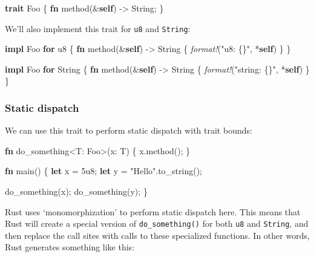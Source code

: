 \documentclass[a4paper,]{book}
\newenvironment{Shaded}{\begin{snugshade}}{\end{snugshade}}
\newcommand{\KeywordTok}[1]{\textcolor[rgb]{0.13,0.29,0.53}{\textbf{{#1}}}}
\newcommand{\DataTypeTok}[1]{\textcolor[rgb]{0.13,0.29,0.53}{{#1}}}
\newcommand{\DecValTok}[1]{\textcolor[rgb]{0.00,0.00,0.81}{{#1}}}
\newcommand{\StringTok}[1]{\textcolor[rgb]{0.31,0.60,0.02}{{#1}}}
\newcommand{\PreprocessorTok}[1]{\textcolor[rgb]{0.56,0.35,0.01}{\textit{{#1}}}}
\newcommand{\NormalTok}[1]{{#1}}
\begin{document}
\begin{Shaded}
\begin{Highlighting}[]
\KeywordTok{trait} \NormalTok{Foo \{}
    \KeywordTok{fn} \NormalTok{method(&}\KeywordTok{self}\NormalTok{) -> }\DataTypeTok{String}\NormalTok{;}
\NormalTok{\}}
\end{Highlighting}
\end{Shaded}

We'll also implement this trait for \texttt{u8} and \texttt{String}:

\begin{Shaded}
\begin{Highlighting}[]
\KeywordTok{impl} \NormalTok{Foo }\KeywordTok{for} \DataTypeTok{u8} \NormalTok{\{}
    \KeywordTok{fn} \NormalTok{method(&}\KeywordTok{self}\NormalTok{) -> }\DataTypeTok{String} \NormalTok{\{ }\PreprocessorTok{format!}\NormalTok{(}\StringTok{"u8: \{\}"}\NormalTok{, *}\KeywordTok{self}\NormalTok{) \}}
\NormalTok{\}}

\KeywordTok{impl} \NormalTok{Foo }\KeywordTok{for} \DataTypeTok{String} \NormalTok{\{}
    \KeywordTok{fn} \NormalTok{method(&}\KeywordTok{self}\NormalTok{) -> }\DataTypeTok{String} \NormalTok{\{ }\PreprocessorTok{format!}\NormalTok{(}\StringTok{"string: \{\}"}\NormalTok{, *}\KeywordTok{self}\NormalTok{) \}}
\NormalTok{\}}
\end{Highlighting}
\end{Shaded}

\subsubsection{Static dispatch}\label{static-dispatch}

We can use this trait to perform static dispatch with trait bounds:

\begin{Shaded}
\begin{Highlighting}[]
\KeywordTok{fn} \NormalTok{do_something<T: Foo>(x: T) \{}
    \NormalTok{x.method();}
\NormalTok{\}}

\KeywordTok{fn} \NormalTok{main() \{}
    \KeywordTok{let} \NormalTok{x = }\DecValTok{5u8}\NormalTok{;}
    \KeywordTok{let} \NormalTok{y = }\StringTok{"Hello"}\NormalTok{.to_string();}

    \NormalTok{do_something(x);}
    \NormalTok{do_something(y);}
\NormalTok{\}}
\end{Highlighting}
\end{Shaded}

Rust uses `monomorphization' to perform static dispatch here. This means
that Rust will create a special version of \texttt{do\_something()} for
both \texttt{u8} and \texttt{String}, and then replace the call sites
with calls to these specialized functions. In other words, Rust
generates something like this:
\end{document}
